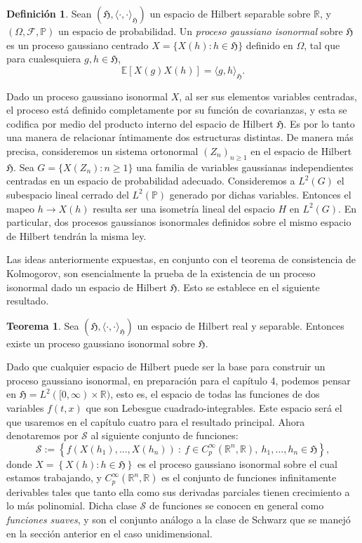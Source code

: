 \documentclass[letterpaper,twoside,12pt]{book}
\newcommand{\R}{\mathbb{R}}
\newcommand{\F}{\mathcal{F}}
\renewcommand{\S}{\mathcal{S}}
\newcommand{\E}{\mathbb{E}}
\renewcommand{\P}{\mathbb{P}}
\newcommand{\1}{\mathds{1}}
\renewcommand{\to}{\rightarrow}
\theoremstyle{definition}
\newtheorem{dfn}{Definición}
\theoremstyle{definition}
\newtheorem{teo}{Teorema}
\theoremstyle{remark}
\theoremstyle{definition}
\theoremstyle{definition}
\theoremstyle{definition}
\theoremstyle{definition}
\theoremstyle{definition}
\begin{document}
\begin{dfn} 
 Sean $(\mathfrak{H},\langle\cdot,\cdot\rangle_{\mathfrak{H}})$ un espacio de Hilbert separable sobre $\R$, y $(\Omega,\F,\P)$ un espacio de probabilidad. Un \textit{proceso gaussiano isonormal} sobre $\mathfrak{H}$ es un proceso gaussiano centrado $X=\{X(h):h\in \mathfrak{H}\}$ definido en $\Omega$, tal que para cualesquiera $g, h\in \mathfrak{H}$, 
 \[
 \E\left[X(g)X(h)\right]=\langle g,h\rangle_{\mathfrak{H}}.
 \]
 \end{dfn}
Dado un proceso gaussiano isonormal $X$, al ser sus elementos variables centradas, el proceso está definido completamente por su función de covarianzas, y esta se codifica por medio del producto interno del espacio de Hilbert $\mathfrak{H}$. Es por lo tanto una manera de relacionar íntimamente dos estructuras distintas. De manera más precisa, consideremos un sistema ortonormal $(Z_n)_{n\geq1}$ en el espacio de Hilbert $\mathfrak{H}$. Sea $G=\{X(Z_n):n\geq1\}$ una familia de variables gaussianas independientes centradas en un espacio de probabilidad adecuado. Consideremos a $L^2(G)$ el subespacio lineal cerrado del $L^2(\P)$ generado por dichas variables. Entonces el mapeo $h\to X(h)$ resulta ser una isometría lineal del espacio $H$ en $L^2(G)$. En particular, dos procesos gaussianos isonormales definidos sobre el mismo espacio de Hilbert tendrán la misma ley.

Las ideas anteriormente expuestas, en conjunto con el teorema de consistencia de Kolmogorov, son esencialmente la prueba de la existencia de un proceso isonormal dado un espacio de Hilbert $\mathfrak{H}$. Esto se establece en el siguiente resultado.

\begin{teo} 
Sea $(\mathfrak{H},\langle\cdot,\cdot\rangle_{\mathfrak{H}})$ un espacio de Hilbert real y separable. Entonces existe un proceso gaussiano isonormal sobre $\mathfrak{H}$.
\end{teo}

Dado que cualquier espacio de Hilbert puede ser la base para construir un proceso gaussiano isonormal, en preparación para el capítulo 4, podemos pensar en $\mathfrak{H}=L^2([0,\infty)\times \R)$, esto es, el espacio de todas las funciones de dos variables $f(t,x)$ que son Lebesgue cuadrado-integrables. Este espacio será el que usaremos en el capítulo cuatro para el resultado principal. Ahora denotaremos por $\S$ al siguiente conjunto de funciones:
\[
\S:=\left\{f(X(h_1),...,X(h_n)) \ : \ f\in C^{\infty}_p(\R^{n},\R), \ h_1,...,h_n\in \mathfrak{H} \right\},
\]
donde $X=\left\{X(h):h\in \mathfrak{H}\right\}$ es el proceso gaussiano isonormal sobre el cual estamos trabajando, y $C^{\infty}_p(\R^{n},\R)$ es el conjunto de funciones infinitamente derivables tales que tanto ella como sus derivadas parciales tienen crecimiento a lo más polinomial. Dicha clase $\S$ de funciones se conocen en general como \textit{funciones suaves}, y son el conjunto análogo a la clase de Schwarz que se manejó en la sección anterior en el caso unidimensional.
\end{document}
